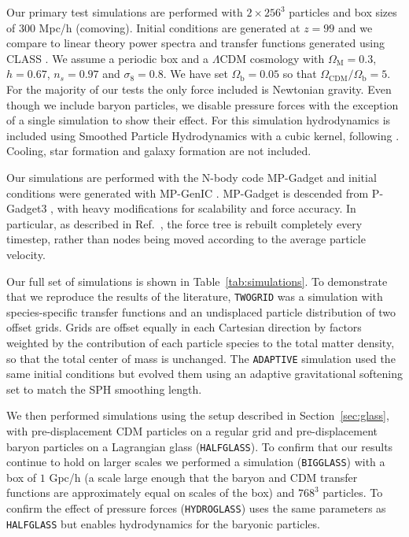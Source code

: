 \documentclass[a4paper,11pt]{article}
\begin{document}
Our primary test simulations are performed with $2\times 256^3$ particles and box sizes of $300$ Mpc/h (comoving). Initial conditions are generated at $z=99$ and we compare to linear theory power spectra and transfer functions generated using CLASS \cite{CLASS}. We assume a periodic box and a $\Lambda$CDM cosmology with $\Omega_\mathrm{M} = 0.3$, $h = 0.67$, $n_s = 0.97$ and $\sigma_8 = 0.8$. We have set $\Omega_\mathrm{b} = 0.05$ so that $\Omega_{\mathrm{CDM}}/ \Omega_\mathrm{b} = 5$. For the majority of our tests the only force included is Newtonian gravity. Even though we include baryon particles, we disable pressure forces with the exception of a single simulation to show their effect. For this simulation hydrodynamics is included using Smoothed Particle Hydrodynamics with a cubic kernel, following \cite{Springel:2005}. Cooling, star formation and galaxy formation are not included.

Our simulations are performed with the N-body code MP-Gadget and initial conditions were generated with MP-GenIC \cite{yu_feng_2018_1451799}. MP-Gadget is descended from P-Gadget3 \cite{Springel:2005}, with heavy modifications for scalability and force accuracy. In particular, as described in Ref.~\cite{Bird:2018}, the force tree is rebuilt completely every timestep, rather than nodes being moved according to the average particle velocity.

Our full set of simulations is shown in Table~\ref{tab:simulations}. To demonstrate that we reproduce the results of the literature, \texttt{TWOGRID} was a simulation with species-specific transfer functions and an undisplaced particle distribution of two offset grids. Grids are offset equally in each Cartesian direction by factors weighted by the contribution of each particle species to the total matter density, so that the total center of mass is unchanged. The \texttt{ADAPTIVE} simulation used the same initial conditions but evolved them using an adaptive gravitational softening set to match the SPH smoothing length.

We then performed simulations using the setup described in Section~\ref{sec:glass}, with pre-displacement CDM particles on a regular grid and pre-displacement baryon particles on a Lagrangian glass (\texttt{HALFGLASS}). To confirm that our results continue to hold on larger scales we performed a simulation (\texttt{BIGGLASS}) with a box of $1$ Gpc/h (a scale large enough that the baryon and CDM transfer functions are approximately equal on scales of the box) and $768^3$ particles. To confirm the effect of pressure forces (\texttt{HYDROGLASS}) uses the same parameters as \texttt{HALFGLASS} but enables hydrodynamics for the baryonic particles.
\end{document}
